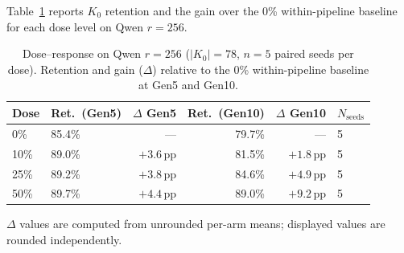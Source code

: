 \documentclass[a4paper,fleqn]{cas-dc}
\newif\ifshowchanges
\newcommand{\rev}[1]{\ifshowchanges{\color{blue}#1}\else{#1}\fi}
\newcommand{\Kcard}{\lvert K_0\rvert}
\begin{document}
\rev{Table~\ref{tab:interventions} reports $K_0$ retention and the gain over
the 0\% within-pipeline baseline for each dose level on Qwen $r=256$.}

\begin{table}[width=.95\linewidth,cols=6,pos=htbp]
\caption{\rev{Dose--response on Qwen $r=256$ ($\Kcard=78$, $n=5$ paired seeds per
dose). Retention and gain ($\Delta$) relative to the 0\% within-pipeline
baseline at Gen5 and Gen10.}}\label{tab:interventions}
\begin{tabular*}{\tblwidth}{@{} llrrrl@{} }
\toprule
\rev{Dose} & \rev{Ret.\ (Gen5)} & \rev{$\Delta$ Gen5} & \rev{Ret.\ (Gen10)} & \rev{$\Delta$ Gen10} & \rev{$N_\mathrm{seeds}$} \\
\midrule
0\%  & \rev{85.4\%} & ---             & \rev{79.7\%} & ---             & 5 \\
10\% & 89.0\% & \rev{$+3.6$}\,pp & \rev{81.5\%} & \rev{$+1.8$}\,pp & 5 \\
25\% & 89.2\% & \rev{$+3.8$}\,pp & 84.6\% & \rev{$+4.9$}\,pp & 5 \\
50\% & 89.7\% & \rev{$+4.4$}\,pp & \rev{89.0\%} & \rev{$+9.2$}\,pp & 5 \\
\bottomrule
\end{tabular*}
{\footnotesize $\Delta$ values are computed from unrounded per-arm means; displayed values are rounded independently.}
\end{table}

\end{document}
